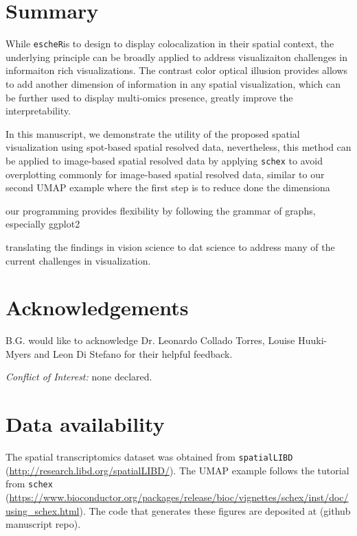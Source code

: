 \documentclass[11pt]{article}
\newcommand{\fixme}[1]{{\color{red} (#1)}}
\newcommand{\coloc}{\texttt{escheR}}
\begin{document}
\section*{Summary}

While \coloc is to design to display colocalization in their spatial context, the underlying principle can be broadly applied to address visualizaiton challenges in informaiton rich visualizations. The contrast color optical illusion provides allows to add another dimension of information in any spatial visualization, which can be further used to display multi-omics presence, greatly improve the interpretability. 

In this manuscript, we demonstrate the utility of the proposed spatial visualization using spot-based spatial resolved data, nevertheless, this method can be applied to image-based spatial resolved data by applying \texttt{schex} to avoid overplotting commonly for image-based spatial resolved data, similar to our second UMAP example where the first step is to reduce done the dimensiona

our programming provides flexibility by following the grammar of graphs, especially ggplot2

translating the findings in vision science to dat science to address many of the current challenges in visualization.


\section*{Acknowledgements}
B.G. would like to acknowledge Dr. Leonardo Collado Torres, Louise Huuki-Myers and Leon Di Stefano for their helpful feedback.

\vspace{0.2in}
\noindent \textit{Conflict of Interest:} none declared.

\section*{Data availability}
The spatial transcriptomics dataset was obtained from \texttt{spatialLIBD} (\url{http://research.libd.org/spatialLIBD/}). The UMAP example follows the tutorial from \texttt{schex} (\url{https://www.bioconductor.org/packages/release/bioc/vignettes/schex/inst/doc/using_schex.html}). The code that generates these figures are deposited at \fixme{github manuscript repo}.
\end{document}
